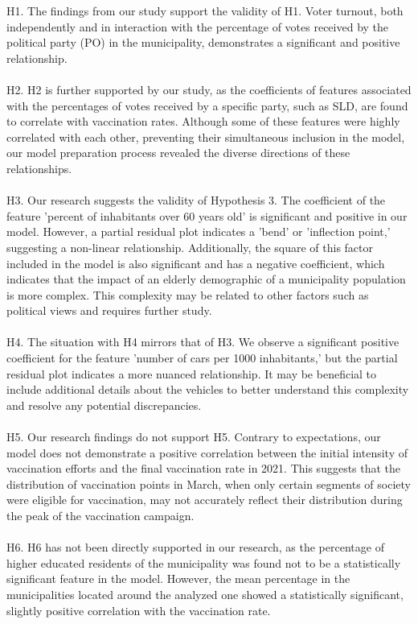 \documentclass[a4paper,12pt]{article} %
\begin{document}
H1. The findings from our study support the validity of H1. Voter turnout, both independently and in interaction with the percentage of votes received by the political party (PO) in the municipality, demonstrates a significant and positive relationship.
\\
\\
H2. H2 is further supported by our study, as the coefficients of features associated with the percentages of votes received by a specific party, such as SLD, are found to correlate with vaccination rates. Although some of these features were highly correlated with each other, preventing their simultaneous inclusion in the model, our model preparation process revealed the diverse directions of these relationships.
\\
\\
H3. Our research suggests the validity of Hypothesis 3. The coefficient of the feature 'percent of inhabitants over 60 years old' is significant and positive in our model. However, a partial residual plot indicates a 'bend' or 'inflection point,' suggesting a non-linear relationship. Additionally, the square of this factor included in the model is also significant and has a negative coefficient, which indicates that the impact of an elderly demographic of a municipality population is more complex. This complexity may be related to other factors such as political views and requires further study.
\\
\\
H4. The situation with H4 mirrors that of H3. We observe a significant positive coefficient for the feature 'number of cars per 1000 inhabitants,' but the partial residual plot indicates a more nuanced relationship. It may be beneficial to include additional details about the vehicles to better understand this complexity and resolve any potential discrepancies.
\\
\\
H5. Our research findings do not support H5. Contrary to expectations, our model does not demonstrate a positive correlation between the initial intensity of vaccination efforts and the final vaccination rate in 2021. This suggests that the distribution of vaccination points in March, when only certain segments of society were eligible for vaccination, may not accurately reflect their distribution during the peak of the vaccination campaign.
\\
\\
H6. H6 has not been directly supported in our research, as the percentage of higher educated residents of the municipality was found not to be a statistically significant feature in the model. However, the mean percentage in the municipalities located around the analyzed one showed a statistically significant, slightly positive correlation with the vaccination rate.
\end{document}
